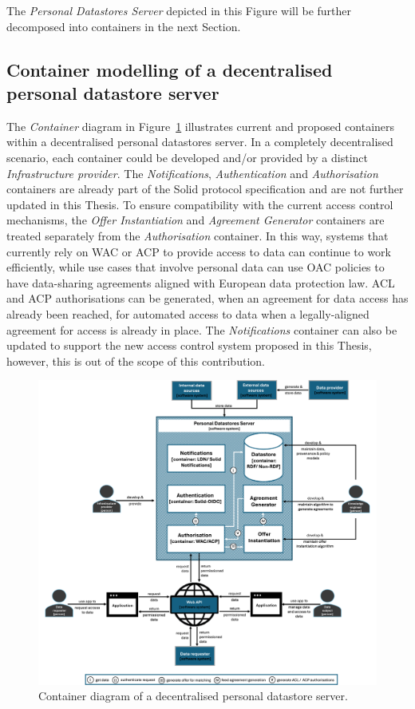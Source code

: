 The \textit{Personal Datastores Server} depicted in this Figure will be further decomposed into containers in the next Section.

\subsection{Container modelling of a decentralised personal datastore server}
\label{sec:c4_container}

The \textit{Container} diagram in Figure~\ref{fig:c4-container} illustrates current and proposed containers within a decentralised personal datastores server.
In a completely decentralised scenario, each container could be developed and/or provided by a distinct \textit{Infrastructure provider}.
The \textit{Notifications}, \textit{Authentication} and \textit{Authorisation} containers are already part of the Solid protocol specification \citep{capadisli_solid_2022} and are not further updated in this Thesis.
To ensure compatibility with the current access control mechanisms, the \textit{Offer Instantiation} and \textit{Agreement Generator} containers are treated separately from the \textit{Authorisation} container.
In this way, systems that currently rely on WAC or ACP to provide access to data can continue to work efficiently, while use cases that involve personal data can use OAC policies to have data-sharing agreements aligned with European data protection law.
ACL and ACP authorisations can be generated, when an agreement for data access has already been reached, for automated access to data when a legally-aligned agreement for access is already in place.
The \textit{Notifications} container can also be updated to support the new access control system proposed in this Thesis, however, this is out of the scope of this contribution.

\begin{figure}[ht]
    \centering
    \includegraphics[width=1\linewidth]{figures//chapter-6/container.png}
    \caption{Container diagram of a decentralised personal datastore server.}
    \label{fig:c4-container}
\end{figure}

